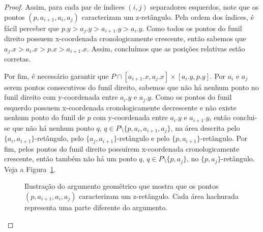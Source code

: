 \begin{proof}
    Assim, para cada par de índices $(i,j)$ separadores esquerdos, note que os pontos $(p,a_{i+1},a_i,a_j)$ caracterizam um z-retângulo. Pela ordem dos índices, é fácil perceber que $p.y > a_j.y > a_{i+1}.y > a_i.y$. Como todos os pontos do funil direito possuem x-coordenada cronologicamente crescente, então sabemos que $a_j.x > a_i.x > p.x > a_{i+1}.x$. Assim, concluímos que as posições relativas estão corretas.

    Por fim, é necessário garantir que $P \cap [a_{i+1}.x,a_j.x] \times [a_i.y,p.y]$. Por $a_i$ e $a_j$ serem pontos consecutivos do funil direito, sabemos que não há nenhum ponto no funil direito com y-coordenada entre $a_i.y$ e $a_j.y$. Como os pontos do funil esquerdo possuem x-coordenada cronologicamente decrescente e não existe nenhum ponto do funil de $p$ com y-coordenada entre $a_i.y$ e $a_{i+1}.y$, então conclui-se que não há nenhum ponto $q$, $q \in P \setminus \{p,a_i,a_{i+1},a_j\}$, na área descrita pelo $\{a_i,a_{i+1}\}$-retângulo, pelo $\{a_j,a_{i+1}\}$-retângulo e pelo $\{p,a_{i+1}\}$-retângulo. Por fim, pelos pontos do funil direito possuírem x-coordenada cronologicamente crescente, então também não há um ponto $q$, $q \in P \setminus \{p,a_j\}$, no $\{p,a_j\}$-retângulo. Veja a Figura~\ref{fig:representacao-areas}. 

    \begin{figure}
        \caption{Ilustração do argumento geométrico que mostra que os pontos $(p,a_{i+1},a_i,a_j)$ caracterizam um z-retângulo. Cada área hachurada representa uma parte diferente do argumento.}
        \label{fig:representacao-areas}
    \end{figure}
\end{proof}

